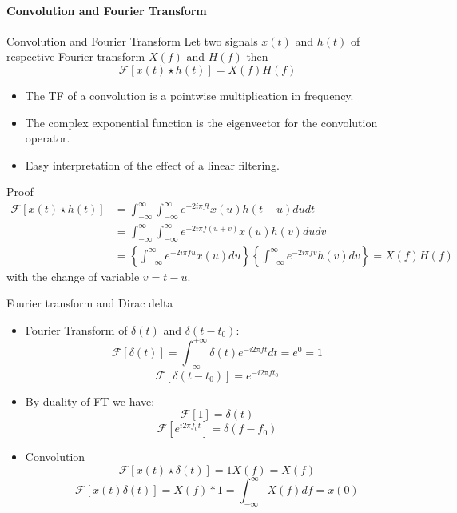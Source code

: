 \paragraph{Convolution and Fourier Transform}
\begin{block}{Convolution and Fourier Transform}
  Let two signals $x(t)$ and $h(t)$ of respective Fourier transform $X(f)$ and
  $H(f)$ then 
  \begin{equation}
    \mathcal{F}
    [ x(t)\star h(t)]  = X(f)H(f)
    \label{eq:tf_conv}
  \end{equation}\vspace{-5mm}
  \begin{itemize}
    \item The TF of a convolution is a pointwise multiplication in frequency.
    \item The complex exponential function is the eigenvector for the convolution operator.
    \item Easy interpretation of the effect of a linear filtering.

  \end{itemize}
\end{block}

\begin{block}{Proof}
  \begin{align*}
    \mathcal{F}
    [ x(t)\star h(t)]&=\int_{-\infty}^\infty \int_{-\infty}^\infty e^{-2i\pi f t} x(u)h(t-u)du dt\\
    &=\int_{-\infty}^\infty \int_{-\infty}^\infty e^{-2i\pi f (u+v)} x(u)h(v)du dv\\
    &= \left\{\int_{-\infty}^\infty  e^{-2i\pi f u} x(u) du\right\}\left\{ \int_{-\infty}^\infty e^{-2i\pi f v} h(v) dv\right\} = X(f)H(f)
  \end{align*}
  with the change of variable $v=t-u$.
\end{block}



\begin{block}{Fourier transform and Dirac delta}
  \begin{itemize}
    \item Fourier Transform of $\delta(t)$ and  $\delta(t-t_0)$:
    $$\mathcal{F}[\delta(t)] = \int_{-\infty}^{+\infty} \delta(t) 
    e^{-i 2\pi f t}dt ={ e^0= 1}$$
    $$\mathcal{F}[\delta(t-t_0)] = 
    e^{-i 2\pi f t_0} $$   
    \item By duality of FT we have:
    $$ \mathcal{F}[1] =  \delta(t) $$
    $$ \mathcal{F}[e^{i 2\pi f_0 t}] = \delta(f-f_0) $$
    \item Convolution
    $$ \mathcal{F}[x(t)\star \delta(t)] = 1X(f)= X(f)$$
    $$ \mathcal{F}[x(t)\delta(t)] = X(f)*1= \int_{-\infty}^\infty X(f)df=x(0)$$
  \end{itemize}
\end{block}




